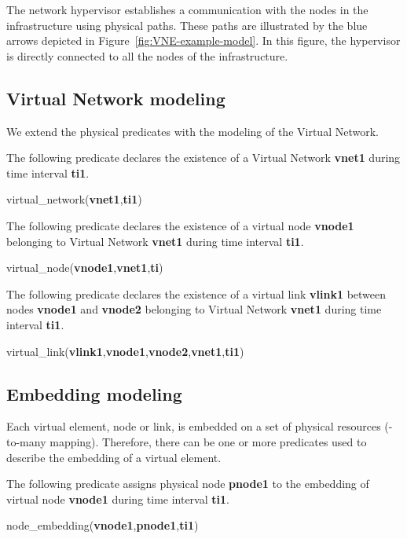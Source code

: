 The network hypervisor establishes a communication with the nodes in the infrastructure using physical paths.
These paths are illustrated by the  blue arrows depicted in Figure~\ref{fig:VNE-example-model}.
In this figure, the hypervisor is directly connected to all the nodes of the infrastructure.

\subsection{Virtual Network modeling}
We extend the physical predicates with the modeling of the Virtual Network.

The following predicate declares the existence of a Virtual Network \textbf{vnet1} during time interval \textbf{ti1}.
\begin{myformula}
virtual\_network(\textbf{vnet1},\textbf{ti1})
\end{myformula}


The following predicate declares the existence of a virtual node \textbf{vnode1} belonging to Virtual Network \textbf{vnet1} during time interval \textbf{ti1}.
\begin{myformula}
virtual\_node(\textbf{vnode1},\textbf{vnet1},\textbf{ti})
\end{myformula}


The following predicate declares the existence of a virtual link \textbf{vlink1} between nodes \textbf{vnode1} and \textbf{vnode2} belonging to Virtual Network \textbf{vnet1} during time interval \textbf{ti1}.
\begin{myformula}
virtual\_link(\textbf{vlink1},\textbf{vnode1},\textbf{vnode2},\textbf{vnet1},\textbf{ti1})
\end{myformula}



\subsection{Embedding modeling}
Each virtual element, node or link, is embedded on a set of physical resources (-to-many mapping).
Therefore, there can be one or more predicates used to describe the embedding of a virtual element.

The following predicate assigns physical node \textbf{pnode1} to the embedding of virtual node \textbf{vnode1} during time interval \textbf{ti1}.
\begin{myformula}
node\_embedding(\textbf{vnode1},\textbf{pnode1},\textbf{ti1})
\end{myformula}



